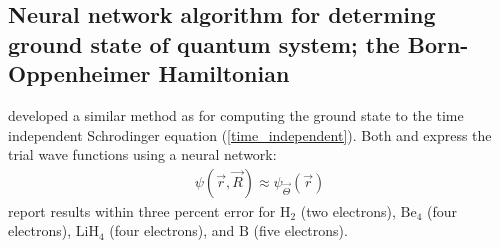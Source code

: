 \documentclass[a4paper,fleqn]{cas-sc}
\begin{document}
\subsection{Neural network algorithm for determing ground state
of quantum system; the Born-Oppenheimer Hamiltonian}

\cite{hermann2020deep} developed a similar method as \cite{HAN2019108929}
for computing the ground state to the
time independent Schrodinger equation (\ref{time_independent}).  Both
\cite{hermann2020deep} and \cite{HAN2019108929} express the trial 
wave functions using a neural network:
\begin{eqnarray}
\psi(\vec{r},\vec{R})\approx \psi_{\vec{\Theta}}(\vec{r})
\end{eqnarray}
\cite{hermann2020deep} report results within three percent error for
$\mbox{H}_{2}$ (two electrons), 
$\mbox{Be}_{4}$ (four electrons), 
$\mbox{LiH}_{4}$ (four electrons), and
$\mbox{B}$ (five electrons).
\end{document}
